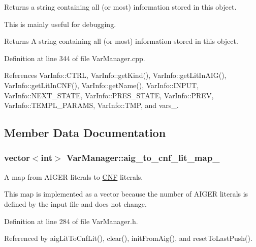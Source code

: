 Returns a string containing all (or most) information stored in this object. 

This is mainly useful for debugging.

\begin{DoxyReturn}{Returns}
A string containing all (or most) information stored in this object. 
\end{DoxyReturn}


Definition at line 344 of file Var\-Manager.\-cpp.



References Var\-Info\-::\-C\-T\-R\-L, Var\-Info\-::get\-Kind(), Var\-Info\-::get\-Lit\-In\-A\-I\-G(), Var\-Info\-::get\-Lit\-In\-C\-N\-F(), Var\-Info\-::get\-Name(), Var\-Info\-::\-I\-N\-P\-U\-T, Var\-Info\-::\-N\-E\-X\-T\-\_\-\-S\-T\-A\-T\-E, Var\-Info\-::\-P\-R\-E\-S\-\_\-\-S\-T\-A\-T\-E, Var\-Info\-::\-P\-R\-E\-V, Var\-Info\-::\-T\-E\-M\-P\-L\-\_\-\-P\-A\-R\-A\-M\-S, Var\-Info\-::\-T\-M\-P, and vars\-\_\-.



\subsection{Member Data Documentation}
\hypertarget{classVarManager_abaa6d10a62f138bdc932a8e76c709849}{
\subsubsection[{aig\-\_\-to\-\_\-cnf\-\_\-lit\-\_\-map\-\_\-}]{\setlength{\rightskip}{0pt plus 5cm}vector$<$int$>$ Var\-Manager\-::aig\-\_\-to\-\_\-cnf\-\_\-lit\-\_\-map\-\_\-\hspace{0.3cm}{\ttfamily [protected]}}}\label{classVarManager_abaa6d10a62f138bdc932a8e76c709849}


A map from A\-I\-G\-E\-R literals to \hyperlink{classCNF}{C\-N\-F} literals. 

This map is implemented as a vector because the number of A\-I\-G\-E\-R literals is defined by the input file and does not change. 

Definition at line 284 of file Var\-Manager.\-h.



Referenced by aig\-Lit\-To\-Cnf\-Lit(), clear(), init\-From\-Aig(), and reset\-To\-Last\-Push().

